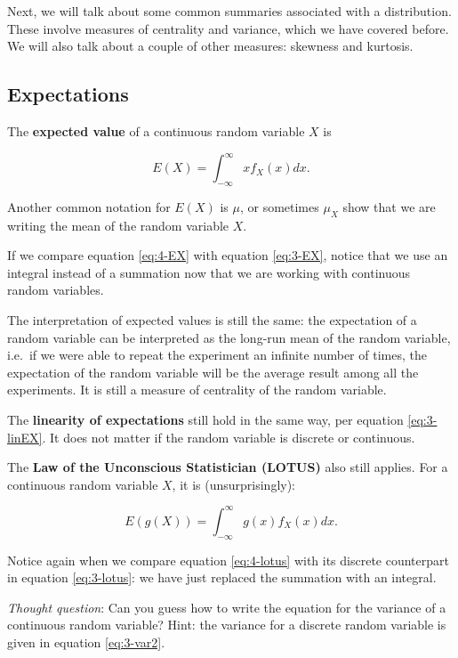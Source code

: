 \documentclass[
]{book}
\begin{document}
Next, we will talk about some common summaries associated with a distribution. These involve measures of centrality and variance, which we have covered before. We will also talk about a couple of other measures: skewness and kurtosis.

\subsection{Expectations}\label{expectations-1}

The \textbf{expected value} of a continuous random variable \(X\) is

\begin{equation} 
E(X) = \int_{-\infty}^{\infty} x f_X(x) dx.
\label{eq:4-EX}
\end{equation}

Another common notation for \(E(X)\) is \(\mu\), or sometimes \(\mu_X\) show that we are writing the mean of the random variable \(X\).

If we compare equation \eqref{eq:4-EX} with equation \eqref{eq:3-EX}, notice that we use an integral instead of a summation now that we are working with continuous random variables.

The interpretation of expected values is still the same: the expectation of a random variable can be interpreted as the long-run mean of the random variable, i.e.~if we were able to repeat the experiment an infinite number of times, the expectation of the random variable will be the average result among all the experiments. It is still a measure of centrality of the random variable.

The \textbf{linearity of expectations} still hold in the same way, per equation \eqref{eq:3-linEX}. It does not matter if the random variable is discrete or continuous.

The \textbf{Law of the Unconscious Statistician (LOTUS)} also still applies. For a continuous random variable \(X\), it is (unsurprisingly):

\begin{equation} 
E(g(X)) = \int_{-\infty}^{\infty} g(x) f_X(x) dx.
\label{eq:4-lotus}
\end{equation}

Notice again when we compare equation \eqref{eq:4-lotus} with its discrete counterpart in equation \eqref{eq:3-lotus}: we have just replaced the summation with an integral.

\emph{Thought question}: Can you guess how to write the equation for the variance of a continuous random variable? Hint: the variance for a discrete random variable is given in equation \eqref{eq:3-var2}.
\end{document}
